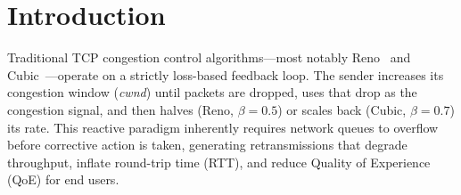 \documentclass[journal]{IEEEtran}
\begin{document}
\section{Introduction}

Traditional TCP congestion control algorithms---most notably Reno~\cite{rfc5681} and Cubic~\cite{rfc9438}---operate on a strictly loss-based feedback loop. The sender increases its congestion window (\emph{cwnd}) until packets are dropped, uses that drop as the congestion signal, and then halves (Reno, $\beta=0.5$) or scales back (Cubic, $\beta=0.7$) its rate. This reactive paradigm inherently requires network queues to overflow before corrective action is taken, generating retransmissions that degrade throughput, inflate round-trip time (RTT), and reduce Quality of Experience (QoE) for end users.
\end{document}
